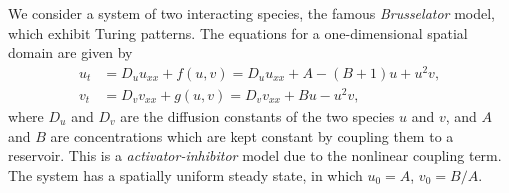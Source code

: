 \begin{Exercise}[name=Brusselator model]
We consider a system of two interacting species, the famous \emph{Brusselator}
model, which exhibit Turing patterns.  The equations for a one-dimensional spatial domain are given by
\begin{equation}
\begin{array}{ll}
u_t &= D_u u_{xx} + f(u,v) = D_u u_{xx} + A -(B+1)u+u^2v,\\
v_t &= D_v v_{xx} + g(u,v) = D_v v_{xx} + Bu-u^2v,
\end{array}
\tag{1}
\end{equation}
where $D_u$ and $D_v$ are the diffusion constants of the two species $u$ and
$v$, and $A$ and $B$ are concentrations which are kept constant by coupling
them to a reservoir.  
This is a \emph{activator-inhibitor} model due to the nonlinear coupling term.
The system has a spatially uniform steady state, in which $u_0=A$, $v_0=B/A$.


\end{Exercise}
